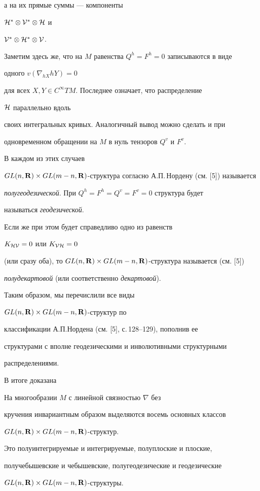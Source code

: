 а на их прямые суммы --- компоненты 


$\cal H^*\otimes\cal V^*\otimes\cal H$ и 


$\cal V^*\otimes\cal H^*\otimes\cal V$. 


 


Заметим здесь же, что на $M$ равенства $Q^h\!=\!F^h\!=\!0$ записываются в виде 


одного $v(\nabla_{hX}hY)\!=\!0$ 


для всех $X,Y\in C^\infty TM$. Последнее означает, что распределение 


$\cal H$ параллельно вдоль 


своих интегральных кривых. Аналогичный вывод можно сделать и при 


одновременном обращении на $M$ в нуль тензоров $Q^v$ и $F^v$.


В каждом из этих случаев 


$GL(n,\bold R)\times GL(m-n,\bold R)$-структура согласно А.П.\,Нордену (см. [5]) называется 


{\it полугеодезической}. При $Q^h=F^h=Q^v=F^v=0$ структура будет 


называться {\it геодезической}. 


Если же при этом будет справедливо одно из равенств 


$K_{\cal H\cal V}=0$ или $K_{\cal V\cal H}=0$ 


(или сразу оба), то $GL(n,\bold R)\times GL(m-n,\bold R)$-структура называется (см. [5]) 


{\it полудекартовой} (или соответственно {\it декартовой}). 


 


\begin{notenonum} Таким образом, мы перечислили все виды 


$GL(n,\bold R)\times GL(m-n,\bold R)$-структур по 


классификации А.П.Нордена (см. [5], с.\,128--129), пополнив ее 


структурами с вполне геодезическими и инволютивными структурными 


распределениями. 


\end{notenonum} 


 


В итоге доказана


 


\begin{thm} На многообразии $M$ с линейной связностью $\nabla$ без 


кручения инвариантным образом выделяются восемь основных классов 


$GL(n,\bold R)\times GL(m-n,\bold R)$-структур. 


Это полуинтегрируемые и интегрируемые, полуплоские и плоские, 


получебышевские и чебышевские, полугеодезические и геодезические 


$GL(n,\bold R)\times GL(m-n,\bold R)$-структуры. 


\end{thm} 


